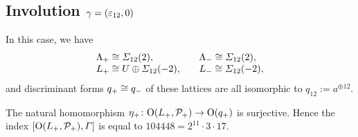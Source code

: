\documentclass{amsart} %
\begin{document}
\subsection{Involution $\gamma=(\varepsilon_{12}, 0)$}\label{subsec:walls12}
%
%
In this case, we have
\[
\begin{array}{ll}
\Lambda_{+}\cong \varSigma_{12}(2), \quad &\Lambda_{-}\cong \varSigma_{12}(2),\\
L_{+}\cong U\oplus \varSigma_{12}(-2), \quad &L_{-}\cong \varSigma_{12}(-2), 
\end{array}
\]
and discriminant forms $q_{+}\cong q_{-}$ of these lattices are all isomorphic to
$q_{12}:=a^{\oplus 12}$.
%
%
%
% 
%
%
\begin{proposition}
The natural homomorphism 
${\eta}_{+}\colon \mathord{\mathrm{O}}(L_{+}, \mathord{\mathcal{P}}_{+}) \to \mathord{\mathrm{O}}(q_{+})$ is surjective.
Hence the index 
$[\mathord{\mathrm{O}}(L_{+}, \mathord{\mathcal{P}}_{+}), \varGamma]$ is equal to 
$104448 ={2}^{11} \cdot {3} \cdot {17}$.
\end{proposition}
%
\end{document}
